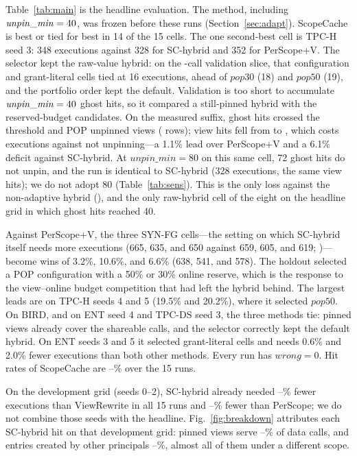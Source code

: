 \documentclass[sigconf, nonacm]{acmart}
\newcommand{\M}[1]{\textsf{#1}}
\begin{document}
Table~\ref{tab:main} is the headline evaluation. The method, including $\mathit{unpin\_min}=40{}$, was frozen before these runs (Section~\ref{sec:adapt}). ScopeCache is best or tied for best in 14 of the 15 cells. The one second-best cell is TPC-H seed 3: 348 executions against 328 for \M{SC-hybrid} and 352 for \M{PerScope+V}. The selector kept the raw-value hybrid: on the \lossValCalls{}-call validation slice, that configuration and grant-literal cells tied at 16 executions, ahead of $\mathit{pop30}$ (18) and $\mathit{pop50}$ (19), and the portfolio order kept the default. Validation is too short to accumulate $\mathit{unpin\_min}=40{}$ ghost hits, so it compared a still-pinned hybrid with the reserved-budget candidates. On the measured suffix, \lossGhost{} ghost hits crossed the threshold and POP unpinned \lossUnpins{} views (\lossUnpinRows{} rows); view hits fell from \lossHitViewHyb{} to \lossHitViewOurs{}, which costs \lossExtraExec{} executions against not unpinning---a 1.1\% lead over \M{PerScope+V} and a 6.1\% deficit against \M{SC-hybrid}. At $\mathit{unpin\_min}=80$ on this same cell, 72 ghost hits do not unpin, and the run is identical to \M{SC-hybrid} (328 executions, the same \lossHitViewHyb{} view hits); we do not adopt 80 (Table~\ref{tab:sens}). This is the only loss against the non-adaptive hybrid (\scVsHybWTL{}), and the only raw-hybrid cell of the eight on the headline grid in which ghost hits reached 40.

Against \M{PerScope+V}, the three SYN-FG cells---the setting on which \M{SC-hybrid} itself needs more executions (665, 635, and 650 against 659, 605, and 619; \hybWTL{})---become wins of 3.2\%, 10.6\%, and 6.6\% (638, 541, and 578). The holdout selected a POP configuration with a 50\% or 30\% online reserve, which is the response to the view--online budget competition that had left the hybrid behind. The largest leads are on TPC-H seeds 4 and 5 (19.5\% and 20.2\%), where it selected $\mathit{pop50}$. On BIRD, and on ENT seed 4 and TPC-DS seed 3, the three methods tie: pinned views already cover the shareable calls, and the selector correctly kept the default hybrid. On ENT seeds 3 and 5 it selected grant-literal cells and needs 0.6\% and 2.0\% fewer executions than both other methods. Every run has $\mathit{wrong}=0$. Hit rates of ScopeCache are \freshHitLo--\freshHitHi\% over the 15 runs.

On the development grid (seeds 0--2), \M{SC-hybrid} already needed \redVRLo--\redVRHi\% fewer executions than \M{ViewRewrite} in all 15 runs and \redPSmainLo--\redPSmainHi\% fewer than \M{PerScope}; we do not combine those seeds with the headline. Fig.~\ref{fig:breakdown} attributes each \M{SC-hybrid} hit on that development grid: pinned views serve \bdViewLo--\bdViewHi\% of data calls, and entries created by other principals \bdOtherLo--\bdOtherHi\%, almost all of them under a different scope.
\end{document}
